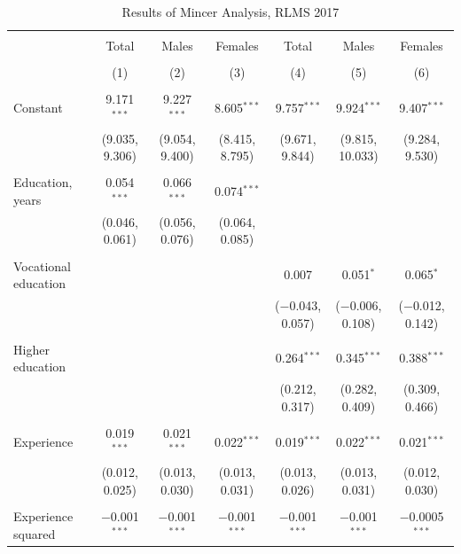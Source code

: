 \documentclass[alpha-refs]{wiley-article-01g}
\begin{document}
\begin{landscape}
	
	\fontsize{9}{11}
	\selectfont
	
	\begin{table}[!htbp] \centering 
\renewcommand{\arraystretch}{1.0}
		\caption{Results of Mincer Analysis, RLMS 2017} 
		\label{} 
		\begin{tabular}{@{\extracolsep{5pt}}lcccccc} 
			\\[-.8ex]\hline 
			\hline \\[-.8ex] 
			& Total & Males & Females & Total & Males & Females \\ 
			\\[-.8ex] & (1) & (2) & (3) & (4) & (5) & (6)\\ 
			\hline \\[-.8ex] 
			Constant & 9.171$^{***}$ & 9.227$^{***}$ & 8.605$^{***}$ & 9.757$^{***}$ & 9.924$^{***}$ & 9.407$^{***}$ \\ 
			& (9.035, 9.306) & (9.054, 9.400) & (8.415, 8.795) & (9.671, 9.844) & (9.815, 10.033) & (9.284, 9.530) \\ 
			& & & & & & \\ 
			Education, years & 0.054$^{***}$ & 0.066$^{***}$ & 0.074$^{***}$ &  &  &  \\ 
			& (0.046, 0.061) & (0.056, 0.076) & (0.064, 0.085) &  &  &  \\ 
			& & & & & & \\ 
			Vocational education &  &  &  & 0.007 & 0.051$^{*}$ & 0.065$^{*}$ \\ 
			&  &  &  & ($-$0.043, 0.057) & ($-$0.006, 0.108) & ($-$0.012, 0.142) \\ 
			& & & & & & \\ 
			Higher education &  &  &  & 0.264$^{***}$ & 0.345$^{***}$ & 0.388$^{***}$ \\ 
			&  &  &  & (0.212, 0.317) & (0.282, 0.409) & (0.309, 0.466) \\ 
			& & & & & & \\ 
			Experience & 0.019$^{***}$ & 0.021$^{***}$ & 0.022$^{***}$ & 0.019$^{***}$ & 0.022$^{***}$ & 0.021$^{***}$ \\ 
			& (0.012, 0.025) & (0.013, 0.030) & (0.013, 0.031) & (0.013, 0.026) & (0.013, 0.031) & (0.012, 0.030) \\ 
			& & & & & & \\ 
			Experience squared & $-$0.001$^{***}$ & $-$0.001$^{***}$ & $-$0.001$^{***}$ & $-$0.001$^{***}$ & $-$0.001$^{***}$ & $-$0.0005$^{***}$ \\ 

\end{tabular}
\end{table}
\end{landscape}
\end{document}
